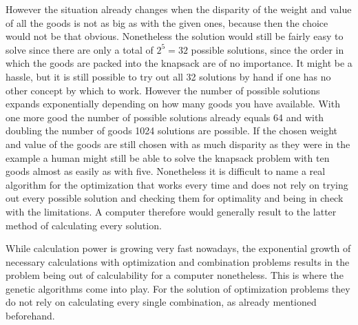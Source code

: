 \documentclass[11pt,a4paper]{article}
\begin{document}
However the situation already changes when the disparity of the weight and value of all the goods is not as big as with the given ones, because then the choice would not be that obvious. Nonetheless the solution would still be fairly easy to solve since there are only a total of $2^5=32$ possible solutions, since the order in which the goods are packed into the knapsack are of no importance. It might be a hassle, but it is still possible to try out all 32 solutions by hand if one has no other concept by which to work.
However the number of possible solutions expands exponentially depending on how many goods you have available. With one more good the number of possible solutions already equals 64 and with doubling the number of goods 1024 solutions are possible. If the chosen weight and value of the goods are still chosen with as much disparity as they were in the example a human might still be able to solve the knapsack problem with ten goods almost as easily as with five.
Nonetheless it is difficult to name a real algorithm for the optimization that works every time and does not rely on trying out every possible solution and checking them for optimality and being in check with the limitations. A computer therefore would generally result to the latter method of calculating every solution.

While calculation power is growing very fast nowadays, the exponential growth of necessary calculations with optimization and combination problems results in the problem being out of calculability for a computer nonetheless.
This is where the genetic algorithms come into play. For the solution of optimization problems they do not rely on calculating every single combination, as already mentioned beforehand.
\end{document}
